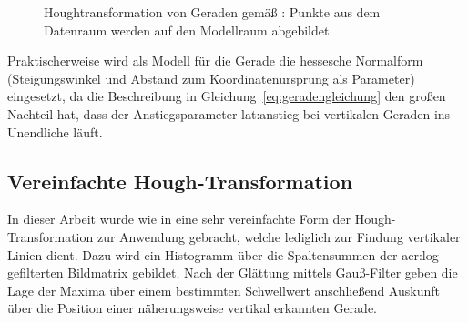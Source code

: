 \begin{figure}[htbp] %
  \centering  
  \hfill
  \caption{Houghtransformation von Geraden gemäß \autocite[S.~482]{jaehneDigitaleBildverarbeitungMit2005}: Punkte aus dem Datenraum werden auf den Modellraum abgebildet.}
\end{figure} 

Praktischerweise wird als Modell für die Gerade die hessesche Normalform (Steigungswinkel und Abstand zum Koordinatenursprung als Parameter) eingesetzt, da die Beschreibung in Gleichung~\eqref{eq:geradengleichung} den großen Nachteil hat, dass der Anstiegsparameter \gls{lat:anstieg} bei vertikalen Geraden ins Unendliche läuft. 

\subsection{Vereinfachte Hough-Transformation}
\label{ssec:grundlagen:hough:vereinfachte}
In dieser Arbeit wurde wie in \autocite{alyRealTimeDetection2008} eine sehr vereinfachte Form der Hough-Transformation zur Anwendung gebracht, welche lediglich zur Findung vertikaler Linien dient. Dazu wird ein Histogramm über die Spaltensummen der \gls{acr:log}-gefilterten Bildmatrix gebildet. Nach der Glättung mittels Gauß-Filter geben die Lage der Maxima über einem bestimmten Schwellwert anschließend Auskunft über die Position einer näherungsweise vertikal erkannten Gerade.

